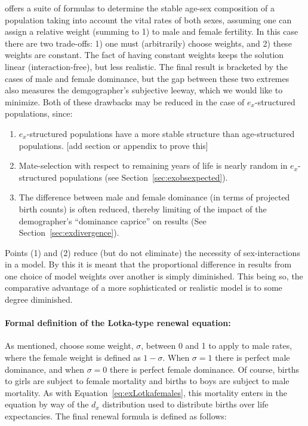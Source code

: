 \citet{goodman1967age} offers a suite of
formulas to determine the stable age-sex composition of a population taking into
account the vital rates of both sexes, assuming one can assign a relative weight
(summing to 1) to male and female fertility. In this case there are two
trade-offs: 1) one must (arbitrarily) choose weights, and 2) these weights are
constant. The fact of having constant weights keeps the solution linear
(interaction-free), but less realistic. The final result is bracketed by the
cases of male and female dominance, but the gap between these two extremes 
also measures the demgographer's subjective leeway, which we would like to
minimize. Both of these drawbacks may be reduced in the case of $e_x$-structured
populations, since: 
\begin{enumerate}
  \item $e_x$-structured populations have a more stable structure
than age-structured populations. [add section or appendix to prove this]
\item Mate-selection with respect to remaining years of
life is nearly random in $e_x$-structured populations (see
Section~\ref{sec:exobsexpected}).
\item The difference between male and female dominance (in terms of projected
birth counts) is often reduced, thereby limiting of the impact of the
demographer's ``dominance caprice'' on results (See
Section~\ref{sec:exdivergence}).
\end{enumerate}
Points (1) and (2) reduce (but do
not eliminate) the necessity of sex-interactions in a model. By this it is meant
that the proportional difference in results from one choice of model weights
over another is simply diminished. This being so, the comparative advantage of a
more sophisticated or realistic model is to some degree diminished. 

\paragraph{Formal definition of the Lotka-type renewal equation:}
\label{sec:2sexlinearmain}
As mentioned, choose some weight, $\sigma$, between 0 and 1 to apply to male
rates, where the female weight is defined as $1 - \sigma$. When $\sigma = 1$
there is perfect male dominance, and when $\sigma = 0$ there is perfect female
dominance. Of course, births to girls are subject to female mortality and births
to boys are subject to male mortality. As with
Equation~\eqref{eq:exLotkafemales}, this mortality enters in the equation by way
of the $d_x$ distribution used to distribute births over life expectancies. The
final renewal formula is defined as follows:

